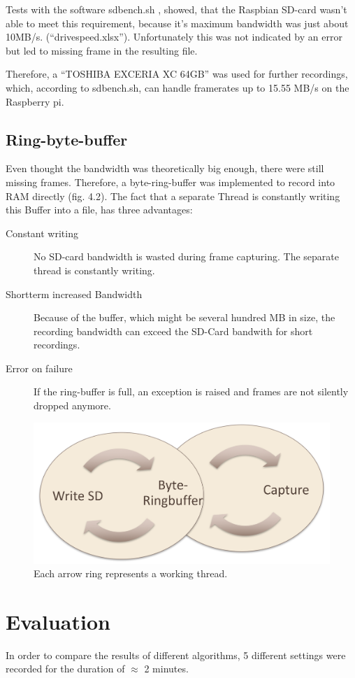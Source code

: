 Tests with the software sdbench.sh \cite{sdbench}, showed, that the Raspbian SD-card wasn't able to meet this requirement, because it's maximum  bandwidth was just about 10MB/s. (\enquote{drivespeed.xlsx}). Unfortunately this was not indicated by an error but led to missing frame in the resulting file.

Therefore, a \enquote{TOSHIBA EXCERIA XC 64GB} was used for further recordings, which, according to sdbench.sh, can handle framerates up to 15.55 MB/s on the Raspberry pi.

\subsection{Ring-byte-buffer}
Even thought the bandwidth was theoretically big enough, there were still missing frames. Therefore, a byte-ring-buffer was implemented to record into RAM directly (fig. 4.2). The fact that a separate Thread is constantly writing this Buffer into a file, has three advantages:
\begin{description}
	\item[Constant writing] No SD-card bandwidth is wasted during frame capturing. The separate thread is constantly writing.
	\item[Shortterm increased Bandwidth] Because of the buffer, which might be several hundred MB in size, the recording bandwidth can exceed the SD-Card bandwith for short recordings.
	\item[Error on failure] If the ring-buffer is full, an exception is raised and frames are not silently dropped anymore.
\end{description}

\begin{figure}[h!]
	\centering
	\includegraphics[width=0.9\linewidth]{bin/ringbuffer}
	\caption{Each arrow ring represents a working thread. }
	\label{fig:ringbuffer}
\end{figure} 

\section{Evaluation}
\label{sec:sequences}
In order to compare the results of different algorithms, 5 different settings were recorded for the duration of $\approx$ 2 minutes. 

